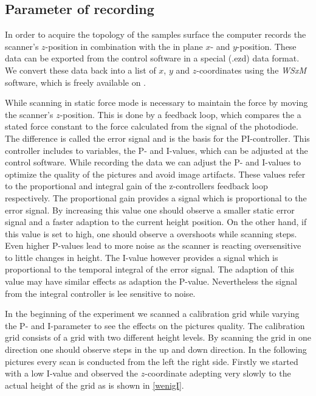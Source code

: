 \documentclass[paper=a4,fontsize=10pt,DIV=18,twocolumn,parskip=half]{scrartcl}
\numberwithin{equation}{section}    %
\begin{document}
\subsection{Parameter of recording}
In order to acquire the topology of the samples surface the computer records the 
scanner's $z$-position in combination with the in plane $x$- and $y$-position. 
These data can be exported from the control software in a special (.ezd) data 
format. We convert these data back into a list of $x$, $y$ and $z$-coordinates 
using the \textit{WSxM} software, which is freely available on \cite{nanotec}. 

While scanning in static force mode is necessary to maintain the force by moving 
the scanner's $z$-position. This is done by a feedback loop, which compares the 
a stated force constant to the force calculated from the signal of the 
photodiode. The difference is called the error signal and is the basis for the 
PI-controller. This controller includes to variables, the P- and I-values, which 
can be adjusted at the control software.
While recording the data we can adjust the P- and I-values to optimize the 
quality of the pictures and avoid image artifacts. These values refer to the 
proportional and integral gain of the z-controllers feedback loop respectively. 
The proportional gain provides a signal which is proportional to the error 
signal. By increasing this value one should observe a smaller static error 
signal and a faster adaption to the current height position.
On the other hand, if this value is set to high, one should observe a overshoots 
while scanning steps. Even higher P-values lead to more noise as the scanner is 
reacting oversensitive to little changes in height. The I-value however provides 
a signal which is proportional to the temporal integral of the error signal. The 
adaption of this value may have similar effects as adaption the P-value. 
Nevertheless the signal from the integral controller is lee sensitive to noise.

In the beginning of the experiment we scanned a calibration grid while varying 
the P- and I-parameter to see the effects on the pictures quality. The 
calibration grid consists of a grid with two different height levels. By 
scanning the grid in one direction one should observe steps in the up and down 
direction. In the following pictures every scan is conducted from the left the 
right side. Firstly we started with a low I-value and observed the 
$z$-coordinate adepting very slowly to the actual height of the grid as is shown 
in \ref{wenigI}.
\end{document}
